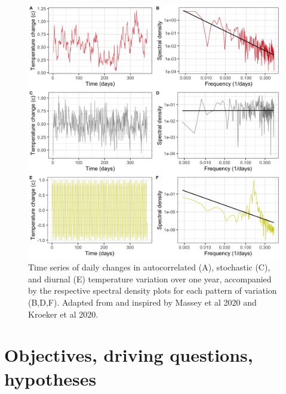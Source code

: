 \documentclass[12pt,twoside]{reedthesis}
\begin{document}
\begin{figure}

{\centering \includegraphics[width=0.9\linewidth]{figures/figure4} 

}

\caption[Patterns of variability and spectral density plots]{Time series of daily changes in autocorrelated (A), stochastic (C), and diurnal (E) temperature variation over one year, accompanied by the respective spectral density plots for each pattern of variation (B,D,F). Adapted from and inspired by Massey et al 2020 and Kroeker et al 2020.}\label{fig:unnamed-chunk-5}
\end{figure}
\clearpage

\hypertarget{objectives-driving-questions-hypotheses}{%
\section{Objectives, driving questions, hypotheses}\label{objectives-driving-questions-hypotheses}}
\end{document}
